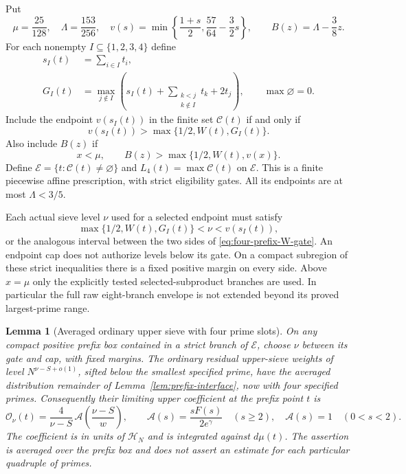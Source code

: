 \documentclass[11pt]{article}
\newtheorem{lemma}[theorem]{Lemma}
\newcommand{\HN}{\mathcal H_N}
\begin{document}
Put
\[
 \mu=\frac{25}{128},\quad \Lambda=\frac{153}{256},\quad
 v(s)=\min\left\{\frac{1+s}{2},\frac{57}{64}-\frac32s\right\},
 \qquad B(z)=\Lambda-\frac38z.
\]
For each nonempty $I\subseteq\{1,2,3,4\}$ define
\begin{align*}
 s_I(t)&=\sum_{i\in I}t_i,\\
 G_I(t)&=\max_{j\notin I}
       \left(s_I(t)+\sum_{\substack{k<j\\k\notin I}}t_k+2t_j\right),
       \qquad \max\varnothing=0.
\end{align*}
Include the endpoint $v(s_I(t))$ in the finite set $\mathcal C(t)$
if and only if
\begin{equation}\label{eq:four-prefix-subset-gate}
 v(s_I(t))>\max\{1/2,W(t),G_I(t)\}.
\end{equation}
Also include $B(z)$ if
\begin{equation}\label{eq:four-prefix-W-gate}
 x<\mu,\qquad B(z)>\max\{1/2,W(t),v(x)\}.
\end{equation}
Define $\mathcal E=\{t:\mathcal C(t)\ne\varnothing\}$ and
$L_4(t)=\max\mathcal C(t)$ on $\mathcal E$.  This is a finite
piecewise affine prescription, with strict eligibility gates.  All
its endpoints are at most $\Lambda<3/5$.

Each actual sieve level $\nu$ used for a selected endpoint must
satisfy
\[
 \max\{1/2,W(t),G_I(t)\}<\nu<v(s_I(t)),
\]
or the analogous interval between the two sides of
\eqref{eq:four-prefix-W-gate}.  An endpoint cap does not authorize
levels below its gate.  On a compact subregion of these strict
inequalities there is a fixed positive margin on every side.
Above $x=\mu$ only the explicitly tested selected-subproduct branches
are used.  In particular the full raw eight-branch envelope is not
extended beyond its proved largest-prime range.

\begin{lemma}[Averaged ordinary upper sieve with four prime slots]
\label{lem:four-prefix-upper-interface}
On any compact positive prefix box contained in a strict branch of
$\mathcal E$, choose $\nu$ between its gate and cap, with fixed
margins.  The ordinary residual upper-sieve weights of level
$N^{\nu-S+o(1)}$, sifted below the smallest specified prime, have
the averaged distribution remainder of
Lemma~\ref{lem:prefix-interface}, now with four specified primes.
Consequently their limiting upper coefficient at the prefix point
$t$ is
\begin{equation}\label{eq:four-prefix-ordinary-kernel}
 \mathcal O_\nu(t)
 =\frac4{\nu-S}\,
       \mathcal A\left(\frac{\nu-S}{w}\right),
 \qquad
 \mathcal A(s)=\frac{sF(s)}{2e^\gamma}\quad(s\ge2),
 \quad \mathcal A(s)=1\quad(0<s<2).
\end{equation}
The coefficient is in units of $\HN$ and is integrated against
$d\mu(t)$.  The assertion is averaged over the prefix box and does
not assert an estimate for each particular quadruple of primes.
\end{lemma}
\end{document}
